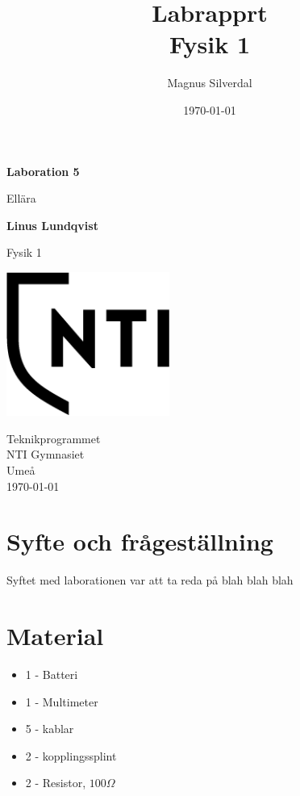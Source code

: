 \documentclass[11p]{article}
\title{Labrapprt \\ \small Fysik 1}
\author{Magnus Silverdal }
\date{\today}
\begin{document}
    \begin{titlepage}
        \begin{center}
            \vspace*{1cm}

            \Huge
            \textbf{Laboration 5}

            \vspace{0.5cm}
            \LARGE
            Ellära

            \vspace{1.5cm}

            \textbf{Linus Lundqvist}

            \vfill


            Fysik 1

            \vspace{0.8cm}

            \includegraphics[width=0.4\textwidth]{NTI Gymnasiet_Symbol_print_svart.png}

            \Large
            Teknikprogrammet\\
            NTI Gymnasiet\\
            Umeå\\
            \today

        \end{center}
    \end{titlepage}
    \section{Syfte och frågeställning}

    Syftet med laborationen var att ta reda på blah blah blah

    \section{Material}

    \begin{itemize}
        \item 1 - Batteri
        \item 1 - Multimeter
        \item 5 - kablar
        \item 2 - kopplingssplint
        \item 2 - Resistor, $100\Omega$
    \end{itemize}
\end{document}
